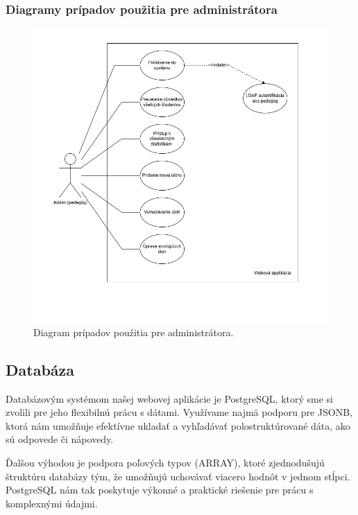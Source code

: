 \subsubsection{Diagramy prípadov použitia pre administrátora}
\begin{figure}[H]
  \centering
  \includegraphics[width=16cm]{img/diagram_admin.png}
  \caption{Diagram prípadov použitia pre administrátora.}
  \label{admindiagram}
\end{figure}



 \subsection{Databáza}
 Databázovým systémom našej webovej aplikácie je PostgreSQL, ktorý sme si zvolili pre jeho flexibilnú prácu s dátami. 
 Využívame najmä podporu pre JSONB, ktorá nám umožňuje efektívne ukladať a vyhľadávať polostruktúrované dáta, ako sú odpovede či nápovedy.

Ďalšou výhodou je podpora poľových typov (ARRAY), ktoré zjednodušujú štruktúru databázy tým, že umožňujú uchovávať viacero hodnôt v jednom stĺpci. 
PostgreSQL nám tak poskytuje výkonné a praktické riešenie pre prácu s komplexnými údajmi.

